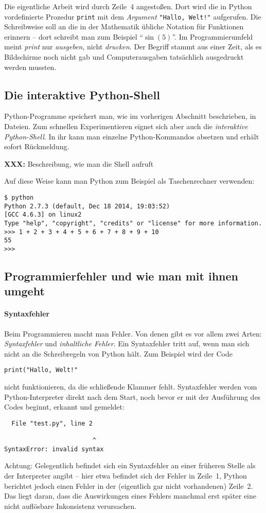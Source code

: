\documentclass{blatt}
\newcommand{\XXX}[1]{\textbf{XXX:} #1}
\begin{document}
Die eigentliche Arbeit wird durch Zeile~4 angestoßen. Dort wird die in Python
vordefinierte Prozedur \texttt{print} mit dem \emph{Argument}
\texttt{"Hallo, Welt!"} aufgerufen. Die Schreibweise soll an die in der Mathematik übliche
Notation für Funktionen erinnern -- dort schreibt man zum Beispiel
"`$\sin(5)$"'. Im Programmierumfeld meint \emph{print} nur \emph{ausgeben},
nicht \emph{drucken}. Der Begriff stammt aus einer Zeit, als es Bildschirme
noch nicht gab und Computerausgaben tatsächlich ausgedruckt werden mussten.


\subsection{Die interaktive Python-Shell}

Python-Programme speichert man, wie im vorherigen Abschnitt beschrieben, in
Dateien. Zum schnellen Experimentieren eignet sich aber auch die
\emph{interaktive Python-Shell}. In ihr kann man einzelne Python-Kommandos
absetzen und erhält sofort Rückmeldung.

\XXX{Beschreibung, wie man die Shell aufruft}

Auf diese Weise kann man Python zum Beispiel als Taschenrechner verwenden:
\begin{verbatim}
$ python
Python 2.7.3 (default, Dec 18 2014, 19:03:52)
[GCC 4.6.3] on linux2
Type "help", "copyright", "credits" or "license" for more information.
>>> 1 + 2 + 3 + 4 + 5 + 6 + 7 + 8 + 9 + 10
55
>>>
\end{verbatim}


\subsection{Programmierfehler und wie man mit ihnen umgeht}

\paragraph{Syntaxfehler}
Beim Programmieren macht man Fehler. Von denen gibt es vor allem zwei Arten:
\emph{Syntaxfehler} und \emph{inhaltliche Fehler}. Ein Syntaxfehler tritt auf,
wenn man sich nicht an die Schreibregeln von Python hält. Zum Beispiel wird der
Code
\begin{verbatim}
print("Hallo, Welt!"
\end{verbatim}
nicht funktionieren, da die schließende Klammer fehlt. Syntaxfehler werden vom
Python-In\-ter\-pre\-ter direkt nach dem Start, noch bevor er mit der Ausführung des
Codes beginnt, erkannt und gemeldet:
\begin{verbatim}
  File "test.py", line 2

                        ^
SyntaxError: invalid syntax
\end{verbatim}
Achtung: Gelegentlich befindet sich ein Syntaxfehler an einer früheren Stelle
als der Interpreter angibt -- hier etwa befindet sich der Fehler in Zeile~1,
Python berichtet jedoch einen Fehler in der (eigentlich gar nicht vorhandenen)
Zeile~2. Das liegt daran, dass die Auswirkungen eines
Fehlers manchmal erst später eine nicht auflösbare Inkonsistenz verursachen.
\end{document}
